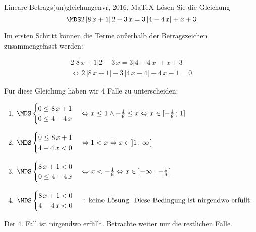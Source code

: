  \providecommand{\MoIl}[1][]{\mbox{}#1]\mathopen{}} 
 \providecommand{\MoIr}[1][]{#1[\mbox{}} 
 \providecommand{\MIntvlSep}{;} 
 \providecommand{\MElSetSep}{\, ; \, } 
 \begin{MAufgabe}{Lineare Betrags(un)gleichungen}{vr, 2016, MaTeX}
L\"osen Sie die Gleichung
$$
 \MDS 2\left| 8\, x + 1 \right|2 - 3\, x= 3 \left| 4 - 4\, x \right| +x + 3
$$  

\ifLsg\MLoesung

Im ersten Schritt k\"onnen die Terme au\ss{}erhalb der Betragszeichen zusammengefasst werden:

\begin{align*} 
 2\left| 8\, x + 1 \right|2 - 3\, x= 3 \left| 4 - 4\, x \right| +x + 3\\ 
\Leftrightarrow2\, \left|8\, x + 1\right| - 3\, \left|4\, x - 4\right| - 4\, x - 1= 0 
 \end{align*}

F\"ur diese Gleichung haben wir 4 F\"alle zu unterscheiden: 
\begin{enumerate}
\item $ \MDS 
\begin{cases} 
 0 \leq 8\, x + 1\\ 
0 \leq 4 - 4\, x
 \end{cases}
\Leftrightarrow x \leq 1 \wedge - \frac{1}{8} \leq x\Leftrightarrow x \in [ - \frac{1}{8} \, \MIntvlSep \, 1]$ 
\item $ \MDS 
\begin{cases} 
 0 \leq 8\, x + 1\\ 
4 - 4\, x < 0
 \end{cases}
\Leftrightarrow 1 < x\Leftrightarrow x \in \MoIl  1 \, \MIntvlSep \, \infty\MoIr $ 
\item $ \MDS 
\begin{cases} 
 8\, x + 1 < 0\\ 
0 \leq 4 - 4\, x
 \end{cases}
\Leftrightarrow x < - \frac{1}{8}\Leftrightarrow x \in \MoIl  -\infty \, \MIntvlSep \, - \frac{1}{8}\MoIr $ 
\item $ \MDS 
\begin{cases} 
 8\, x + 1 < 0\\ 
4 - 4\, x < 0
 \end{cases}
 \mbox{ : keine L\"osung. Diese Bedingung ist nirgendwo erf\"ullt.}$ 
\end{enumerate} 
Der 4. Fall ist nirgendwo erf\"ullt. Betrachte weiter nur die restlichen F\"alle.
 

\end{MAufgabe}
